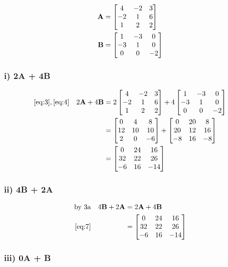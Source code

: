\documentclass{article}
\begin{document}
\begin{align} 
    \label{eq:3} 
    \textbf{A} &= \begin{bmatrix} 4 & -2 & 3\\ -2 & 1 & 6\\ 1 & 2 & 2 \end{bmatrix}
    \\
    \label{eq:4}
    \textbf{B} &= \begin{bmatrix} 1 & -3 & 0\\ -3 & 1 & 0\\ 0 & 0 & -2 \end{bmatrix} 
\end{align}

\subsubsection*{i) 2\textbf{A} + 4\textbf{B}} 

\begin{align}
    \label{eq:5} 
    \eqref{eq:3}, \eqref{eq:4} &&
    2\textbf{A} + 4\textbf{B} &= 2\begin{bmatrix} 4 & -2 & 3\\ -2 & 1 & 6\\ 1 & 2 & 2 \end{bmatrix} + 4\begin{bmatrix} 1 & -3 & 0\\ -3 & 1 & 0\\ 0 & 0 & -2 \end{bmatrix}
    \\
    \label{eq:6} 
    &&
    &=
    \begin{bmatrix}
    0 & 4 & 8\\
    12 & 10 & 10\\
    2 & 0 & -6
    \end{bmatrix}
    +
    \begin{bmatrix}
    0 & 20 & 8\\
    20 & 12 & 16\\
    -8 & 16 & -8
    \end{bmatrix}
    \\
    \label{eq:7}
    &&
    &=
    \begin{bmatrix}
    0 & 24 & 16\\
    32 & 22 & 26\\
    -6 & 16 & -14
    \end{bmatrix}
\end{align}

\subsubsection*{ii) 4\textbf{B} + 2\textbf{A}}

\begin{align}
    \label{eq:8}
    \text{by 3a} && 4\textbf{B}+2\textbf{A}&=2\textbf{A}+4\textbf{B}
    \\
    \label{eq:9}
    \eqref{eq:7} && &=
    \begin{bmatrix}
    0 & 24 & 16\\
    32 & 22 & 26\\
    -6 & 16 & -14
    \end{bmatrix}
\end{align}

\subsubsection*{iii) 0\textbf{A} + \textbf{B}}
\end{document}
